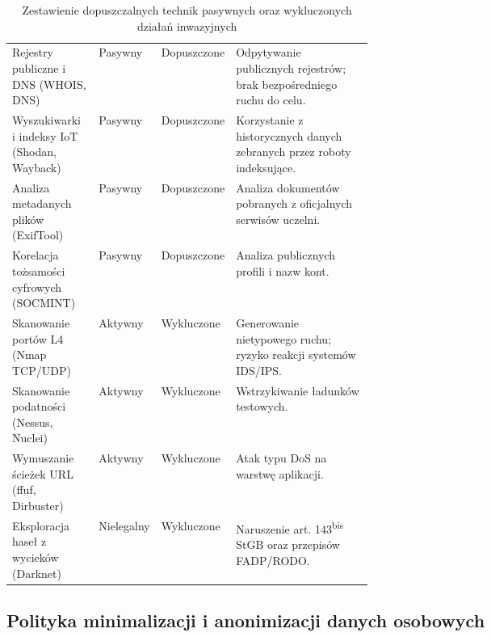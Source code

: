 \begin{table}[H]
    \centering
    \caption{Zestawienie dopuszczalnych technik pasywnych oraz wykluczonych działań inwazyjnych}\label{tab:legalnosc-osint}
    \tablefont
    \begin{tabularx}{\linewidth}{L{0.24\linewidth} C{0.14\linewidth} C{0.14\linewidth} Y}
        \toprule
         &  &  &  \\
        \midrule
        Rejestry publiczne i DNS (WHOIS, DNS) & Pasywny & Dopuszczone & Odpytywanie publicznych rejestrów; brak bezpośredniego ruchu do celu. \\
        Wyszukiwarki i indeksy IoT (Shodan, Wayback) & Pasywny & Dopuszczone & Korzystanie z historycznych danych zebranych przez roboty indeksujące. \\
        Analiza metadanych plików (ExifTool) & Pasywny & Dopuszczone & Analiza dokumentów pobranych z oficjalnych serwisów uczelni. \\
        Korelacja tożsamości cyfrowych (SOCMINT) & Pasywny & Dopuszczone & Analiza publicznych profili i nazw kont. \\
        \midrule
        Skanowanie portów L4 (Nmap TCP/UDP) & Aktywny & Wykluczone & Generowanie nietypowego ruchu; ryzyko reakcji systemów IDS/IPS. \\
        Skanowanie podatności (Nessus, Nuclei) & Aktywny & Wykluczone & Wstrzykiwanie ładunków testowych. \\
        Wymuszanie ścieżek URL (ffuf, Dirbuster) & Aktywny & Wykluczone & Atak typu DoS na warstwę aplikacji. \\
        Eksploracja haseł z wycieków (Darknet) & Nielegalny & Wykluczone & Naruszenie art. 143\textsuperscript{bis} StGB oraz przepisów FADP/RODO. \\
        \bottomrule
    \end{tabularx}
\end{table}

\subsection{Polityka minimalizacji i anonimizacji danych osobowych}\label{subsec:zasady-anonimizacji}

